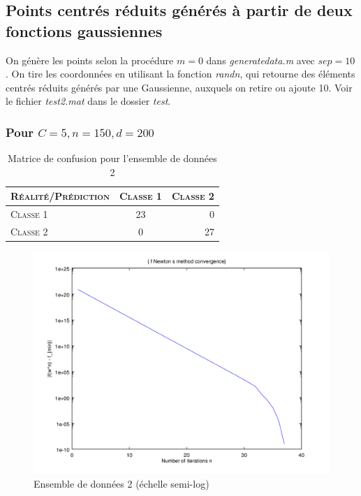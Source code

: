 \documentclass{article}
\begin{document}
\subsection{Points centrés réduits générés à partir de deux fonctions gaussiennes}

On génère les points selon la procédure $m = 0$ dans \emph{generatedata.m} avec $sep=10$. On tire les coordonnées en utilisant la fonction \emph{randn}, qui retourne des éléments centrés réduits générés par une Gaussienne, auxquels on retire ou ajoute 10. Voir le fichier \emph{test2.mat} dans le dossier \emph{test}. 

\subsubsection{Pour $C=5, n=150, d=200$}

     \begin{table}[H]
       \caption{Matrice de confusion pour l'ensemble de données 2}
       \begin{tabular}{|l|c|r|}
         \hline
         \textsc{Réalité/Prédiction} & \textsc{Classe 1} & \textsc{Classe 2}\\
         \hline
         \textsc{Classe 1} & 23 & 0\\
         \hline
         \textsc{Classe 2} & 0 & 27\\
         \hline
       \end{tabular}
     \end{table}

         \begin{figure}[H]
           \begin{center}
             \includegraphics[scale=0.5]{images/cvnewton2.png}
             \caption{Ensemble de données 2 (échelle semi-log)}
           \end{center}
         \end{figure}
\end{document}
